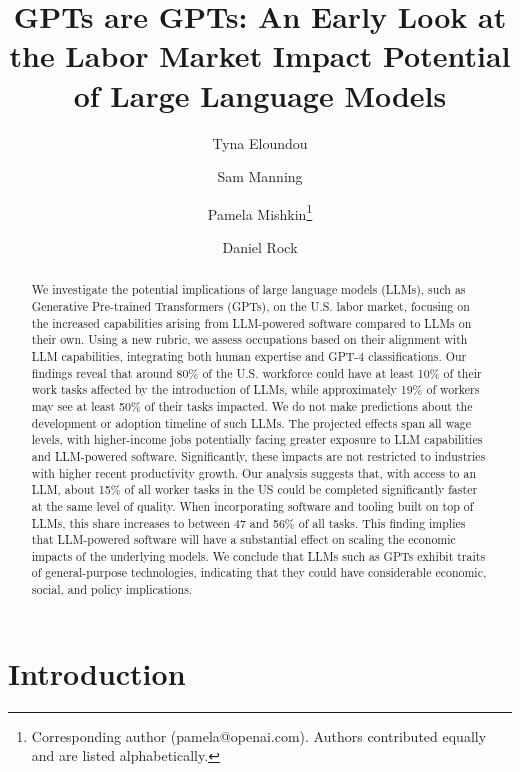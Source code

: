 \documentclass[11pt]{article}
\title{GPTs are GPTs: An Early Look at the Labor Market Impact Potential of Large Language Models}
\author[1]{Tyna Eloundou}
\author[1,2]{Sam Manning}
\author[1]{Pamela Mishkin\thanks{Corresponding author (pamela@openai.com). Authors contributed equally and are listed alphabetically.}}
\author[3]{Daniel Rock}
\affil[1]{OpenAI}
\affil[2]{OpenResearch}
\affil[3]{University of Pennsylvania}
\begin{document}
\fancyhf{}
\maketitle

\begin{abstract}

We investigate the potential implications of large language models (LLMs), such as Generative Pre-trained Transformers (GPTs), on the U.S. labor market, focusing on the increased capabilities arising from LLM-powered software compared to LLMs on their own. Using a new rubric, we assess occupations based on their alignment with LLM capabilities, integrating both human expertise and GPT-4 classifications. Our findings reveal that around 80\% of the U.S. workforce could have at least 10\% of their work tasks affected by the introduction of LLMs, while approximately 19\% of workers may see at least 50\% of their tasks impacted. We do not make predictions about the development or adoption timeline of such LLMs. The projected effects span all wage levels, with higher-income jobs potentially facing greater exposure to LLM capabilities and LLM-powered software. Significantly, these impacts are not restricted to industries with higher recent productivity growth. Our analysis suggests that, with access to an LLM, about 15\% of all worker tasks in the US could be completed significantly faster at the same level of quality. When incorporating software and tooling built on top of LLMs, this share increases to between 47 and 56\% of all tasks. This finding implies that LLM-powered software will have a substantial effect on scaling the economic impacts of the underlying models. We conclude that LLMs such as GPTs exhibit traits of general-purpose technologies, indicating that they could have considerable economic, social, and policy implications.

\end{abstract}

\section{Introduction}
\end{document}
